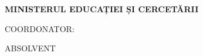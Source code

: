 \begin{titlepage}
\thispagestyle{empty}
\begin{center}
\vspace*{0.7cm}

{\bfseries MINISTERUL EDUCAȚIEI ȘI CERCETĂRII\par}
{\bfseries \universitate\par}
{\bfseries \facultate\par}
{\bfseries \specializare\par}
{\bfseries \formaInvatamant\par}

\vspace*{4.4cm}

\parbox{0.88\textwidth}{\centering\bfseries\fontsize{16}{18}\selectfont \titluLucrare\par}

\vspace*{4.2cm}

\noindent
\begin{minipage}[t]{0.42\textwidth}
\raggedright
COORDONATOR:\par
\coordonatorTitlu{} \textbf{\coordonatorNume}
\end{minipage}
\hfill
\begin{minipage}[t]{0.30\textwidth}
\raggedright
ABSOLVENT\par
\textbf{\absolvent}
\end{minipage}

\vfill

{\localitate\par}
{\anUniversitar\par}
\vspace*{0.5cm}
\end{center}
\end{titlepage}
